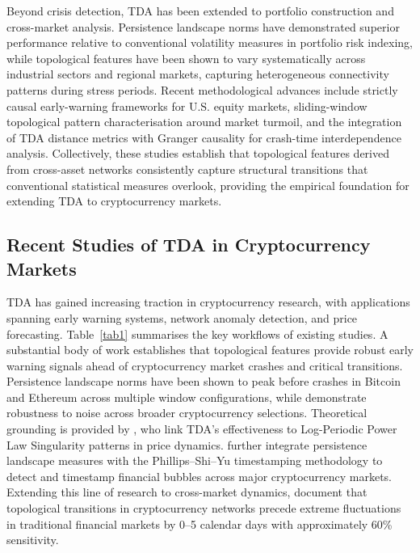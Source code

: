 \documentclass[11pt,reqno]{amsart}
\numberwithin{equation}{section} %
\begin{document}
Beyond crisis detection, TDA has been extended to portfolio construction and cross-market analysis. 
Persistence landscape norms have demonstrated superior performance relative to conventional volatility measures in portfolio risk indexing\cite{RN5468,RN5799,RN5946}, while topological features have been shown to vary systematically across industrial sectors and regional markets, capturing heterogeneous connectivity patterns during stress periods\cite{RN5795,RN6087,RN5487}. 
Recent methodological advances include strictly causal early-warning frameworks for U.S. equity markets\cite{RN3840}, sliding-window topological pattern characterisation around market turmoil\cite{RN3842}, and the integration of TDA distance metrics with Granger causality for crash-time interdependence analysis\cite{RN3845}. 
Collectively, these studies establish that topological features derived from cross-asset networks consistently capture structural transitions that conventional statistical measures overlook, providing the empirical foundation for extending TDA to cryptocurrency markets.

\subsection{Recent Studies of TDA in Cryptocurrency Markets}

TDA has gained increasing traction in cryptocurrency research, with applications spanning early warning systems, network anomaly detection, and price forecasting. Table~\ref{tab1} summarises the key workflows of existing studies.
A substantial body of work establishes that topological features provide robust early warning signals ahead of cryptocurrency market crashes and critical transitions. 
Persistence landscape norms have been shown to peak before crashes in Bitcoin and Ethereum across multiple window configurations\cite{gidea2020topological,saengduean2020topological,bansal2023identifying}, while \citet{rudkin2023topology} demonstrate robustness to noise across broader cryptocurrency selections. 
Theoretical grounding is provided by \citet{akingbade2024topological}, who link TDA's effectiveness to Log-Periodic Power Law Singularity patterns in price dynamics. 
\citet{arvanitis2024mild} further integrate persistence landscape measures with the Phillips--Shi--Yu timestamping methodology to detect and timestamp financial bubbles across major cryptocurrency markets. 
Extending this line of research to cross-market dynamics, \citet{song2025can} document that topological transitions in cryptocurrency networks precede extreme fluctuations in traditional financial markets by 0--5 calendar days with approximately 60\% sensitivity.
\end{document}
